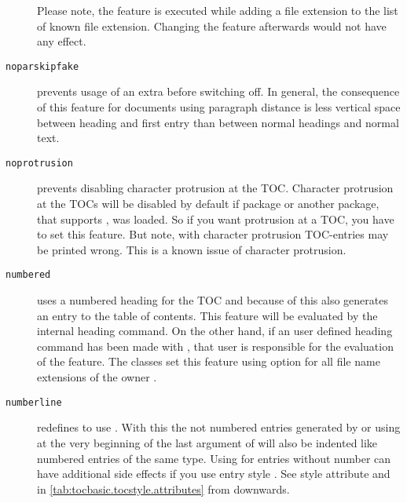 \begin{description}
  Please note, the feature is executed while adding a
  file extension to the list of known file extension. Changing the feature
  afterwards would not have any effect.
\item[\texttt{noparskipfake}] prevents
  usage of an extra  before switching  off. In
  general, the consequence of this feature for documents using paragraph
  distance is less vertical space between heading and first entry than between
  normal headings and normal text.
\item[\texttt{noprotrusion}] prevents
  disabling character protrusion at the TOC. Character protrusion at the TOCs
  will be disabled by default if package
   or another package, that
  supports , was loaded. So if
  you want protrusion at a TOC, you have to set this feature. But
  note, with character protrusion TOC-entries may be
  printed wrong. This is a known issue of character protrusion.
\item[\texttt{numbered}] uses a numbered heading for the TOC and because of
  this also generates an entry to the table of contents. This feature will be
  evaluated by the internal heading command. On the other hand, if an user
  defined heading command has been made with , that user
  is responsible for the evaluation of the feature. The \KOMAScript{} classes
  set this feature using option %
   for all file name extensions of the
  owner .
\item[\texttt{numberline}] \leavevmode{}%
  redefines  to use . With this the not
  numbered entries generated by \KOMAScript{} or using  at
  the very beginning of the last argument of  will also
  be indented like numbered entries of the same
  type. Using  for
  entries without number can have
  additional side effects if you use entry style . See style
  attribute  and  in
  \autoref{tab:tocbasic.tocstyle.attributes} from
   downwards.


\end{description}
